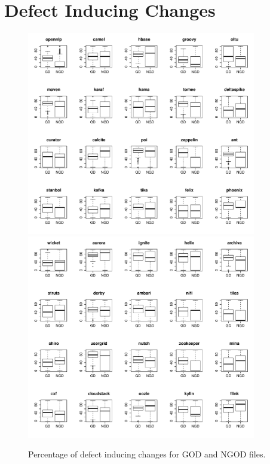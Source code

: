 \chapter{Defect Inducing Changes}
\begin{figure}[tb]
	\centering
	\includegraphics[width=100mm]{figures/chapter4/rq2_god_boxplots_1}
	\includegraphics[width=100mm]{figures/chapter4/rq2_god_boxplots_2}
	\caption{Percentage of defect inducing changes for GOD and NGOD files.}
	\label{figure:percentage_of_bug_inducing_god_vs_ngod}
\end{figure}


